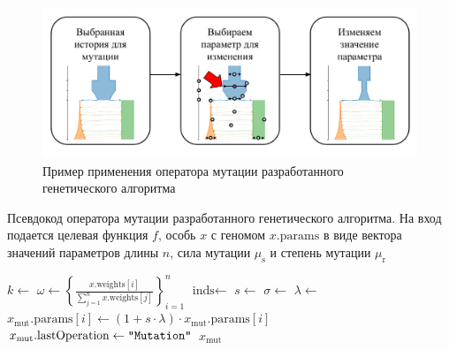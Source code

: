\begin{figure}[ht]
  \centering
  \includegraphics[width=\linewidth]{images/part2/genetics_algorithm/Mutation_rus.pdf}
  \caption{Пример применения оператора мутации разработанного генетического алгоритма}
  \label{fig:part2:mutation}
\end{figure}

\begin{algorithm}
\caption{Псевдокод оператора мутации разработанного генетического алгоритма. На вход подается целевая функция $f$, особь $x$ с геномом $x.\text{params}$ в виде вектора значений параметров длины $n$, сила мутации $\mu_\text{s}$ и степень мутации $\mu_\text{r}$}
\label{alg:part2:mutation}
\begin{algorithmic}[1]
     
\EndIf
\State $k \leftarrow$  
\State $\omega \leftarrow \left\{\frac{x.\text{weights}[i]}{\sum_{j=1}^n x.\text{weights}[j]}\right\}_{i=1}^n$  
\State $\text{inds} \leftarrow$  
 
    \State $s  \leftarrow$ 
    \State $\sigma  \leftarrow$ 
    \State $\lambda  \leftarrow$ 
    \State $x_{\text{mut}}.\text{params}[i] \leftarrow (1 + s \cdot \lambda) \cdot x_{\text{mut}}.\text{params}[i]$
\EndFor
{} 
     
    \EndFor
\EndIf
\State $x_{\text{mut}}.\text{lastOperation} \leftarrow \text{\texttt{"Mutation"}}$
\State \Return $x_{\text{mut}}$
\EndFunction
\end{algorithmic}
\end{algorithm}


